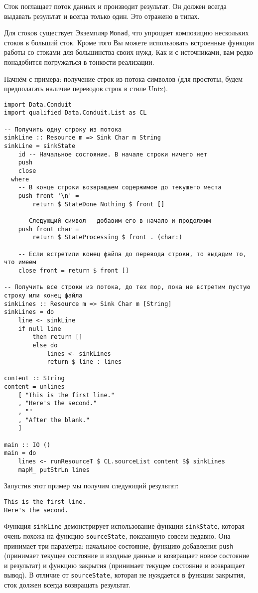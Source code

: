 Сток поглащает поток данных и производит результат. Он должен всегда выдавать результат
и всегда только один. Это отражено в типах.

Для стоков существует Экземпляр \lstinline=Monad=, что упрощает композицию нескольких стоков в больший
сток. Кроме того Вы 
можете использовать встроенные функции работы со стоками для большинства своих нужд. Как и с источниками,
вам редко понадобится погружаться в тонкости реализации.

Начнём с примера:
получение строк из потока символов (для простоты, будем предполагать наличие переводов
строк в стиле Unix).

\begin{lstlisting}
import Data.Conduit
import qualified Data.Conduit.List as CL

-- Получить одну строку из потока
sinkLine :: Resource m => Sink Char m String
sinkLine = sinkState
    id -- Начальное состояние. В начале строки ничего нет
    push
    close
  where
    -- В конце строки возвращаем содержимое до текущего места
    push front '\n' =
        return $ StateDone Nothing $ front []

    -- Следующий символ - добавим его в начало и продолжим
    push front char =
        return $ StateProcessing $ front . (char:)

    -- Если встретили конец файла до перевода строки, то выдадим то, что имеем
    close front = return $ front []

-- Получить все строки из потока, до тех пор, пока не встретим пустую строку или конец файла
sinkLines :: Resource m => Sink Char m [String]
sinkLines = do
    line <- sinkLine
    if null line
        then return []
        else do
            lines <- sinkLines
            return $ line : lines

content :: String
content = unlines
    [ "This is the first line."
    , "Here's the second."
    , ""
    , "After the blank."
    ]

main :: IO ()
main = do
    lines <- runResourceT $ CL.sourceList content $$ sinkLines
    mapM_ putStrLn lines
\end{lstlisting}
Запустив этот пример мы получим следующий результат:
\begin{verbatim}
This is the first line.
Here's the second.
\end{verbatim}

Функция \lstinline=sinkLine= демонстрирует использование функции \lstinline=sinkState=, которая
очень похожа на функцию \lstinline=sourceState=, показанную совсем недавно. Она принимает три параметра: начальное
состояние,
функцию добавления \lstinline=push=
(принимает текущее состояние и входные данные и возвращает новое состояние и результат)
и функцию закрытия (принимает текущее состояние и возвращает вывод).
В отличие от \lstinline=sourceState=, которая не нуждается в функции закрытия, сток
должен всегда возвращать результат.

